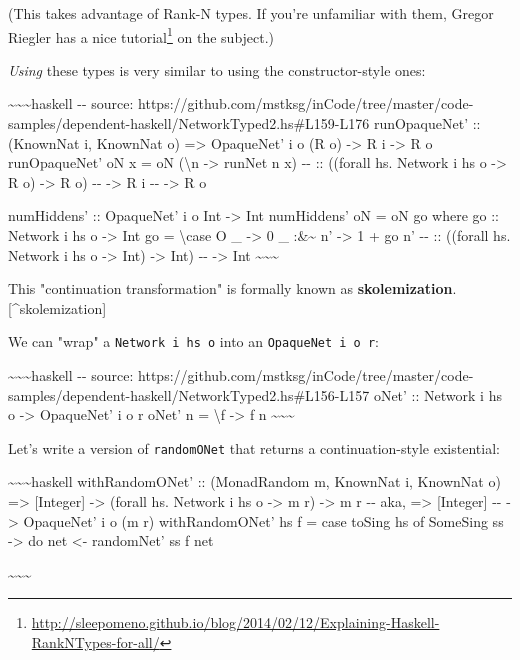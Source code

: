 \documentclass[]{article}
\renewcommand{\href}[2]{#2\footnote{\url{#1}}}
\begin{document}
(This takes advantage of Rank-N types. If you're unfamiliar with them, Gregor
Riegler has a
\href{http://sleepomeno.github.io/blog/2014/02/12/Explaining-Haskell-RankNTypes-for-all/}{nice
tutorial} on the subject.)

\emph{Using} these types is very similar to using the constructor-style ones:

\textasciitilde{}\textasciitilde{}\textasciitilde{}haskell -\/- source:
https://github.com/mstksg/inCode/tree/master/code-samples/dependent-haskell/NetworkTyped2.hs\#L159-L176
runOpaqueNet' :: (KnownNat i, KnownNat o) =\textgreater{} OpaqueNet' i o (R o)
-\textgreater{} R i -\textgreater{} R o runOpaqueNet' oN x = oN
(\textbackslash{}n -\textgreater{} runNet n x) -\/- :: ((forall hs. Network i hs
o -\textgreater{} R o) -\textgreater{} R o) -\/- -\textgreater{} R i -\/-
-\textgreater{} R o

numHiddens' :: OpaqueNet' i o Int -\textgreater{} Int numHiddens' oN = oN go
where go :: Network i hs o -\textgreater{} Int go = \textbackslash{}case O \_
-\textgreater{} 0 \_ :\&\textasciitilde{} n' -\textgreater{} 1 + go n' -\/- ::
((forall hs. Network i hs o -\textgreater{} Int) -\textgreater{} Int) -\/-
-\textgreater{} Int \textasciitilde{}\textasciitilde{}\textasciitilde{}

This "continuation transformation" is formally known as
\textbf{skolemization}.{[}\^{}skolemization{]}

We can "wrap" a \texttt{Network\ i\ hs\ o} into an
\texttt{OpaqueNet\textquotesingle{}\ i\ o\ r}:

\textasciitilde{}\textasciitilde{}\textasciitilde{}haskell -\/- source:
https://github.com/mstksg/inCode/tree/master/code-samples/dependent-haskell/NetworkTyped2.hs\#L156-L157
oNet' :: Network i hs o -\textgreater{} OpaqueNet' i o r oNet' n =
\textbackslash{}f -\textgreater{} f n
\textasciitilde{}\textasciitilde{}\textasciitilde{}

Let's write a version of \texttt{randomONet} that returns a continuation-style
existential:

\textasciitilde{}\textasciitilde{}\textasciitilde{}haskell withRandomONet' ::
(MonadRandom m, KnownNat i, KnownNat o) =\textgreater{} {[}Integer{]}
-\textgreater{} (forall hs. Network i hs o -\textgreater{} m r) -\textgreater{}
m r -\/- aka, =\textgreater{} {[}Integer{]} -\/- -\textgreater{} OpaqueNet' i o
(m r) withRandomONet' hs f = case toSing hs of SomeSing ss -\textgreater{} do
net \textless{}- randomNet' ss f net

\textasciitilde{}\textasciitilde{}\textasciitilde{}
\end{document}
